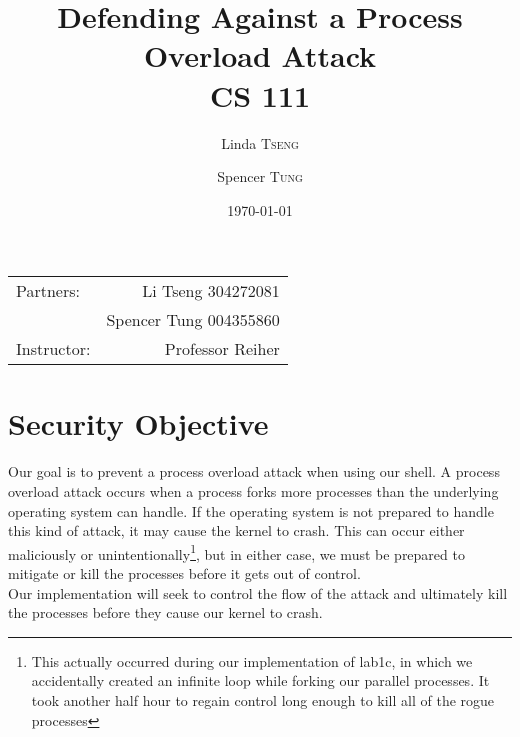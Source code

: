 \documentclass{article}
\title{Defending Against a Process Overload Attack \\ CS 111} %
\author{Linda \textsc{Tseng}
		\and
		Spencer \textsc{Tung}} %
\date{\today} %
\begin{document}
\maketitle %

\begin{center}
\begin{tabular}{l r} 
Partners: & Li Tseng 304272081 \\ %
& Spencer Tung 004355860 \\
Instructor: & Professor Reiher %
\end{tabular}
\end{center}



\section{Security Objective}

Our goal is to prevent a process overload attack when using our shell. A 
process overload attack occurs when a process forks more processes than the
underlying operating system can handle. If the operating system is not prepared
to handle this kind of attack, it may cause the kernel to crash. This can 
occur either maliciously or unintentionally\footnote{This actually occurred
during our implementation of lab1c, in which we accidentally created an 
infinite loop while forking our parallel processes. It took another half hour
to regain control long enough to kill all of the rogue processes}, but in 
either case, we must be prepared to mitigate or kill the processes before it 
gets out of control. \\ 

Our implementation will seek to control the flow of the attack and ultimately
kill the processes before they cause our kernel to crash.

\end{document}
